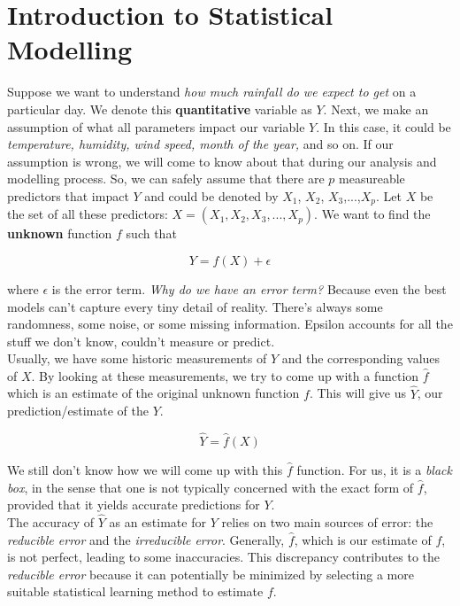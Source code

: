 \section{Introduction to Statistical Modelling}

Suppose we want to understand \textit{how much rainfall do we expect to get} on a particular day. We denote this \textbf{quantitative} variable as $Y$. Next, we make an assumption of what all parameters impact our variable $Y$. In this case, it could be \textit{temperature, humidity, wind speed, month of the year,} and so on. If our assumption is wrong, we will come to know about that during our analysis and modelling process. So, we can safely assume that there are $p$ measureable predictors that impact $Y$ and could be denoted by $X_1$, $X_2$, $X_3$,...,$X_p$.  Let $X$ be the set of all these predictors: $X = (X_1, X_2, X_3, ..., X_p)$. We want to find the \textbf{unknown} function $f$ such that

\[
Y = f(X) + \epsilon
\]

where $\epsilon$ is the error term. \textit{Why do we have an error term?} Because even the best models can’t capture every tiny detail of reality. There’s always some randomness, some noise, or some missing information. Epsilon accounts for all the stuff we don't know, couldn’t measure or predict.\\

Usually, we have some historic measurements of $Y$ and the corresponding values of $X$. By looking at these measurements, we try to come up with a function $\hat{f}$ which is an estimate of the original unknown function $f$. This will give us $\hat{Y}$, our prediction/estimate of the $Y$. 

\[
\hat{Y} = \hat{f}(X)
\]

We still don't know how we will come up with this $\hat{f}$ function. For us, it is a \textit{black box}, in the sense that one is not typically concerned with the exact form of $\hat{f}$, provided that it yields accurate predictions for $Y$.\cite{islr}\\

The accuracy of $\hat{Y}$ as an estimate for $Y$ relies on two main sources of error: the \textit{reducible error} and the \textit{irreducible error}. Generally, $\hat{f}$, which is our estimate of $f$, is not perfect, leading to some inaccuracies. This discrepancy contributes to the \textit{reducible error} because it can potentially be minimized by selecting a more suitable statistical learning method to estimate $f$. \\

